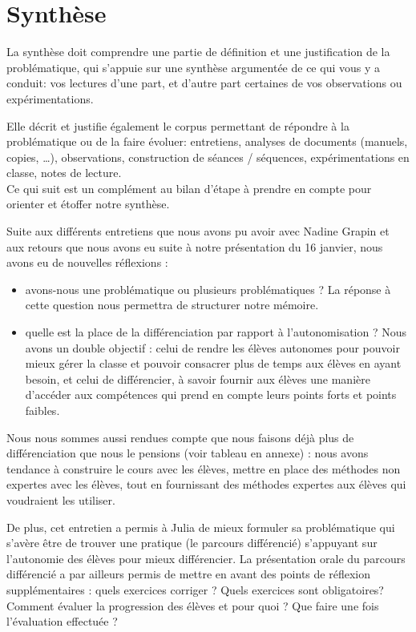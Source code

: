 \section{Synthèse}

{\color{red}La synthèse doit comprendre une partie de définition et une justification de la problématique, qui s'appuie sur une synthèse argumentée de ce qui vous y a conduit: vos lectures d'une part, et d'autre part certaines de vos observations ou expérimentations.

Elle décrit et justifie également le corpus permettant de répondre à la problématique ou de la faire évoluer: entretiens, analyses de documents (manuels, copies, …), observations, construction de séances / séquences, expérimentations en classe, notes de lecture.\\

Ce qui suit est un complément au bilan d'étape à prendre en compte pour orienter et étoffer notre synthèse.}

Suite aux différents entretiens que nous avons pu avoir avec Nadine Grapin et aux retours que nous avons eu suite à notre présentation du 16 janvier, nous avons eu de nouvelles réflexions :
\begin{itemize}
    \item avons-nous une problématique ou plusieurs problématiques ? La réponse à cette question nous permettra de structurer notre mémoire.
    \item quelle est la place de la différenciation par rapport à l’autonomisation ? Nous avons un double objectif : celui de rendre les élèves autonomes pour pouvoir mieux gérer la classe et pouvoir consacrer plus de temps aux élèves en ayant besoin, et celui de différencier, à savoir fournir aux élèves une manière d’accéder aux compétences qui prend en compte leurs points forts et points faibles.
\end{itemize}

Nous nous sommes aussi rendues compte que nous faisons déjà plus de différenciation que nous le pensions (voir tableau en annexe) : nous avons tendance à construire le cours avec les élèves, mettre en place des méthodes non expertes avec les élèves, tout en fournissant des méthodes expertes aux élèves qui voudraient les utiliser.

De plus, cet entretien a permis à Julia de mieux formuler sa problématique qui s’avère être de trouver une pratique (le parcours différencié) s’appuyant sur l’autonomie des élèves pour mieux différencier. La présentation orale du parcours différencié a par ailleurs permis de mettre en avant des points de réflexion supplémentaires : quels exercices corriger ? Quels exercices sont obligatoires? Comment évaluer la progression des élèves et pour quoi ? Que faire une fois l’évaluation effectuée ?\\

